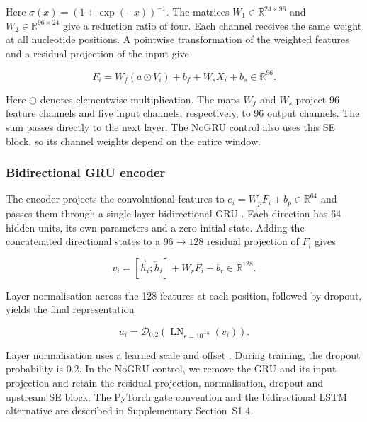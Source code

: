 \documentclass[webpdf,contemporary,large]{current_assets/oup-authoring-template}
\newcommand{\supsect}[1]{Supplementary Section~#1}
\begin{document}
Here $\sigma(x)=(1+\exp(-x))^{-1}$. The matrices $W_1\in\mathbb R^{24\times96}$ and $W_2\in\mathbb R^{96\times24}$ give a reduction ratio of four. Each channel receives the same weight at all nucleotide positions. A pointwise transformation of the weighted features and a residual projection of the input \citep{he2016resnet} give

\begin{equation}
F_i=W_f(a\odot V_i)+b_f+W_sX_i+b_s
\in\mathbb R^{96}.
\label{eq:motif_residual}
\end{equation}

Here $\odot$ denotes elementwise multiplication. The maps $W_f$ and $W_s$ project 96 feature channels and five input channels, respectively, to 96 output channels. The sum passes directly to the next layer. The NoGRU control also uses this SE block, so its channel weights depend on the entire window.

\subsubsection{Bidirectional GRU encoder}

The encoder projects the convolutional features to $e_i=W_pF_i+b_p\in\mathbb R^{64}$ and passes them through a single-layer bidirectional GRU \citep{cho2014rnnencoder,schuster1997brnn}. Each direction has 64 hidden units, its own parameters and a zero initial state. Adding the concatenated directional states to a $96\rightarrow128$ residual projection of $F_i$ gives

\begin{equation}
v_i=[\overrightarrow h_i;\overleftarrow h_i]+W_rF_i+b_r
\in\mathbb R^{128}.
\label{eq:bidirectional_sum}
\end{equation}

Layer normalisation across the 128 features at each position, followed by dropout, yields the final representation

\begin{equation}
u_i=\mathcal D_{0.2}\!\left(\operatorname{LN}_{\epsilon=10^{-5}}(v_i)\right).
\label{eq:recurrent_residual}
\end{equation}

Layer normalisation uses a learned scale and offset \citep{ba2016layernorm}. During training, the dropout probability is 0.2. In the NoGRU control, we remove the GRU and its input projection and retain the residual projection, normalisation, dropout and upstream SE block. The PyTorch gate convention and the bidirectional LSTM alternative are described in \supsect{S1.4}.
\end{document}
